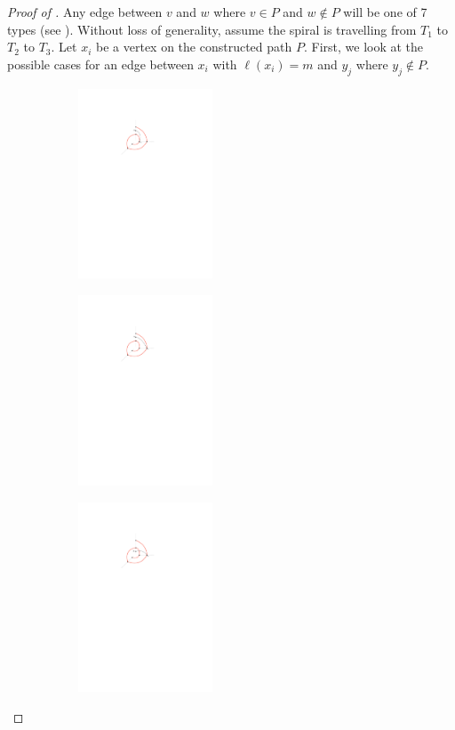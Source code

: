 \documentclass{patmorin}
\begin{document}
\begin{proof}[Proof of ]
 Any edge between $v$ and $w$ where $v \in P$ and $w \not\in P$ will be one of 7 types (see ).
 Without loss of generality, assume the spiral is travelling from $T_1$ to $T_2$ to $T_3$. Let $x_i$ be a vertex on the constructed path $P$.
 First, we look at the possible cases for an edge between $x_i$ with $\ell(x_i) = m$ and $y_j$ where $y_j \notin P$.


 \renewcommand{\thesubfigure}{\arabic{subfigure}}
  \begin{figure}
    \begin{center}
    \begin{subfigure}[t]{0.3\hsize}\includegraphics[width=40mm]{figs/2layermaximum-1} \caption{}\end{subfigure}
    \begin{subfigure}[t]{0.3\hsize}\includegraphics[width=40mm]{figs/2layermaximum-2} \caption{}\end{subfigure}
    \begin{subfigure}[t]{0.3\hsize}\includegraphics[width=40mm]{figs/2layermaximum-3} \caption{}\end{subfigure}

\end{center}
\end{figure}
\end{proof}
\end{document}
